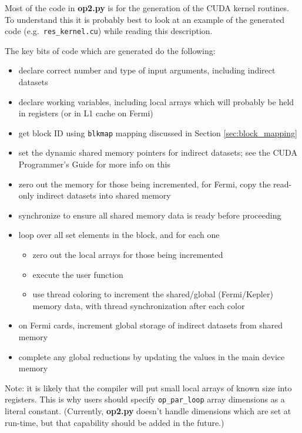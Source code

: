 \documentclass[12pt]{article}
\begin{document}
Most of the code in {\bf op2.py} is for the generation of the CUDA
kernel routines.  To understand this it is probably best to look
at an example of the generated code (e.g.~{\tt res\_kernel.cu})
while reading this description.

The key bits of code which are generated do the following:
\begin{itemize}
\item
declare correct number and type of input arguments, including
indirect datasets

\item
declare working variables, including local arrays which will probably
be held in registers (or in L1 cache on Fermi)

\item
get block ID using {\tt blkmap} mapping discussed in Section
\ref{sec:block_mapping}

\item
set the dynamic shared memory pointers for indirect datasets; see
the CUDA Programmer's Guide for more info on this

\item
zero out the memory for those being incremented, for Fermi,
copy the read-only indirect datasets into shared memory


\item
synchronize to ensure all shared memory data is ready before proceeding

\item
loop over all set elements in the block, and for each one
 \begin{itemize}
 \item zero out the local arrays for those being incremented
 \item execute the user function
 \item use thread coloring to increment the shared/global (Fermi/Kepler) memory data,
       with thread synchronization after each color
 \end{itemize}

\item
on Fermi cards, increment global storage of indirect datasets from shared memory

\item
complete any global reductions by updating the values in the main device
memory

\end{itemize}


Note: it is likely that the compiler will put small local arrays of
known size into registers.  This is why users should specify
{\tt op\_par\_loop} array dimensions as a literal constant.
(Currently, {\bf op2.py} doesn't handle dimensions which are set at
run-time, but that capability should be added in the future.)
\end{document}
